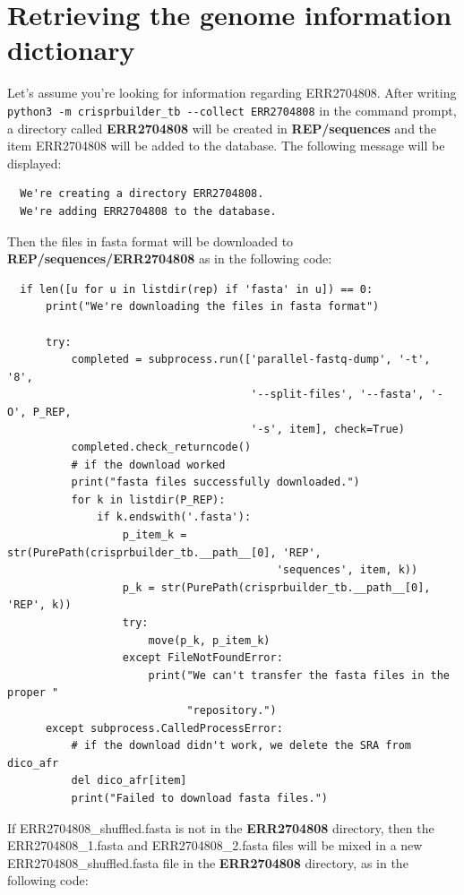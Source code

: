 \documentclass[twoside,a4paper,11pt,frenchb,openany]{report}
\begin{document}
    \section*{Retrieving the genome information
dictionary}\label{retrieving-the-genome-information-dictionary}

    Let's assume you're looking for information regarding ERR2704808. After
writing \texttt{python3\ -m\ crisprbuilder\_tb\ -\/-collect\ ERR2704808}
in the command prompt, a directory called \textbf{ERR2704808} will be
created in \textbf{REP/sequences} and the item ERR2704808 will be added
to the database. The following message will be displayed:

    \begin{verbatim}
  We're creating a directory ERR2704808.
  We're adding ERR2704808 to the database.
\end{verbatim}

    Then the files in fasta format will be downloaded to
\textbf{REP/sequences/ERR2704808} as in the following code:

\begin{verbatim}
  if len([u for u in listdir(rep) if 'fasta' in u]) == 0:
      print("We're downloading the files in fasta format")

      try:
          completed = subprocess.run(['parallel-fastq-dump', '-t', '8',
                                      '--split-files', '--fasta', '-O', P_REP,
                                      '-s', item], check=True)
          completed.check_returncode()
          # if the download worked
          print("fasta files successfully downloaded.")
          for k in listdir(P_REP):
              if k.endswith('.fasta'):
                  p_item_k = str(PurePath(crisprbuilder_tb.__path__[0], 'REP',
                                          'sequences', item, k))
                  p_k = str(PurePath(crisprbuilder_tb.__path__[0], 'REP', k))
                  try:
                      move(p_k, p_item_k)
                  except FileNotFoundError:
                      print("We can't transfer the fasta files in the proper "
                            "repository.")
      except subprocess.CalledProcessError:
          # if the download didn't work, we delete the SRA from dico_afr
          del dico_afr[item]
          print("Failed to download fasta files.")
\end{verbatim}

    If ERR2704808\_shuffled.fasta is not in the \textbf{ERR2704808}
directory, then the ERR2704808\_1.fasta and ERR2704808\_2.fasta files
will be mixed in a new ERR2704808\_shuffled.fasta file in the
\textbf{ERR2704808} directory, as in the following code:
\end{document}
